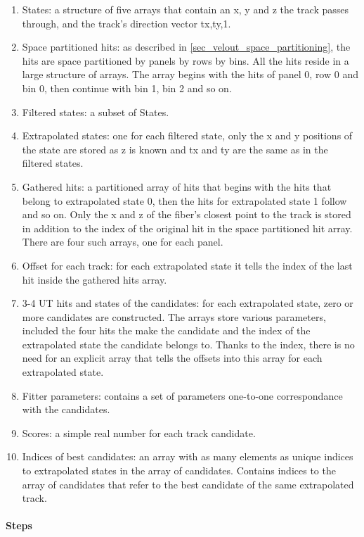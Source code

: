 \documentclass[12pt]{article}
\begin{document}
\begin{enumerate}
	\item States: a structure of five arrays that contain an x, y and z the track passes through, and the track's direction vector tx,ty,1.
	\item Space partitioned hits: as described in \ref{sec_velout_space_partitioning}, the hits are space partitioned by panels by rows by bins. All the hits reside in a large structure of arrays. The array begins with the hits of panel 0, row 0 and bin 0, then continue with bin 1, bin 2 and so on.
	\item Filtered states: a subset of States.
	\item Extrapolated states: one for each filtered state, only the x and y positions of the state are stored as z is known and tx and ty are the same as in the filtered states.
	\item Gathered hits: a partitioned array of hits that begins with the hits that belong to extrapolated state 0, then the hits for extrapolated state 1 follow and so on. Only the x and z of the fiber's closest point to the track is stored in addition to the index of the original hit in the space partitioned hit array. There are four such arrays, one for each panel.
	\item Offset for each track: for each extrapolated state it tells the index of the last hit inside the gathered hits array.
	\item 3-4 UT hits and states of the candidates: for each extrapolated state, zero or more candidates are constructed. The arrays store various parameters, included the four hits the make the candidate and the index of the extrapolated state the candidate belongs to. Thanks to the index, there is no need for an explicit array that tells the offsets into this array for each extrapolated state.
	\item Fitter parameters: contains a set of parameters one-to-one correspondance with the candidates.
	\item Scores: a simple real number for each track candidate.
	\item Indices of best candidates: an array with as many elements as unique indices to extrapolated states in the array of candidates. Contains indices to the array of candidates that refer to the best candidate of the same extrapolated track.
\end{enumerate}

\paragraph{Steps} \mbox{}\vspace{0.4pc}
\end{document}
